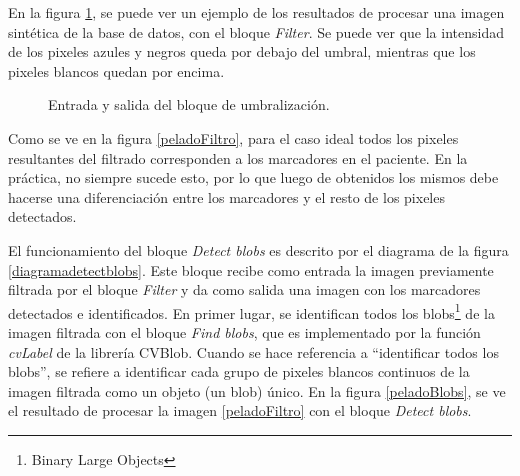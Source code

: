 En la figura \ref{ejemploUmbralizacion}, se puede ver un ejemplo de los resultados de procesar una imagen sintética de la base de datos, con el bloque \emph{Filter}. Se puede ver que la intensidad de los pixeles azules y negros queda por debajo del umbral, mientras que los pixeles blancos quedan por encima. %

\begin{figure}[H]
        \centering
         
  \caption{Entrada y salida del bloque de umbralización.}
      \label{ejemploUmbralizacion}
\end{figure}

Como se ve en la figura \ref{peladoFiltro}, para el caso ideal todos los pixeles resultantes del filtrado corresponden a los marcadores en el paciente. En la práctica, no siempre sucede esto, por lo que luego de obtenidos los mismos debe hacerse una diferenciación entre los marcadores y el resto de los pixeles detectados.

El funcionamiento del bloque \emph{Detect blobs} es descrito por el diagrama de la figura \ref{diagramadetectblobs}. Este bloque recibe como entrada la imagen previamente filtrada por el bloque \emph{Filter} y da como salida una imagen con los marcadores detectados e identificados. En primer lugar, se identifican todos los blobs\footnote{Binary Large Objects\cite{defBlob}} de la imagen filtrada con el bloque \emph{Find blobs}, que es implementado por la función \emph{cvLabel} de la librería CVBlob\cite{cvblob}. Cuando se hace referencia a ``identificar todos los blobs'', se refiere a identificar cada grupo de pixeles blancos continuos de la imagen filtrada como un objeto (un blob) único. En la figura \ref{peladoBlobs}, se ve el resultado de procesar la imagen \ref{peladoFiltro} con el bloque \emph{Detect blobs}. 

